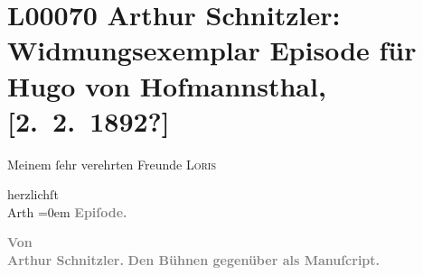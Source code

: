 

\section[Arthur Schnitzler: Widmungsexemplar Episode für Hugo von Hofmannsthal, {[}2. 2. 1892?{]}]{L00070 Arthur Schnitzler: Widmungsexemplar Episode für Hugo von Hofmannsthal,
               {[}2. 2. 1892?{]}}
\nopagebreak{}
\rehead{ }\normalsize\beginnumbering{}
\toendnotes[C]{\smallbreak\pagebreak[2]}
\toendnotes[C]{\smallbreak}
\pstart
           \noindent{}{\pb}Meinem ſehr verehrten Freunde \textsc{Loris}\pend
           
\pstart
           herzlichſt{\\[\baselineskip]}\spacefill\mbox{Arth}\pend
           \leftskip=0em{}{\vspace{1\baselineskip}}
\pstart
           \centering{}\textcolor{gray}{\textbf{\textbf{Epiſode.}}}\pend
           
\pstart
           \centering{}\textcolor{gray}{\textbf{Von}}{\\}\textcolor{gray}{\textbf{Arthur Schnitzler.}}\pend
           {\vspace{1\baselineskip}}
\pstart
           \centering{}\textcolor{gray}{\textbf{Den Bühnen gegenüber als Manuſcript.}}\pend
           
